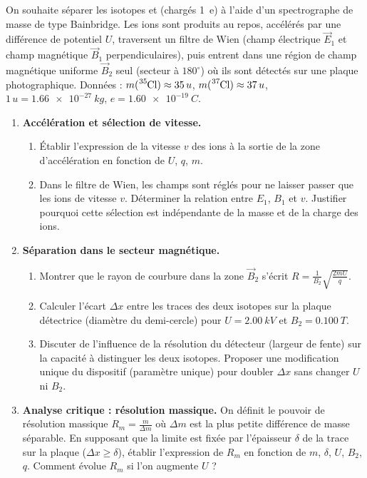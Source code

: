 \documentclass[11pt]{article}
\begin{document}
\begin{exercice}
On souhaite séparer les isotopes  et  (chargés \SI{+1}{e}) à l'aide d'un spectrographe de masse de type Bainbridge. Les ions sont produits au repos, accélérés par une différence de potentiel $U$, traversent un filtre de Wien (champ électrique $\vec{E}_1$ et champ magnétique $\vec{B}_1$ perpendiculaires), puis entrent dans une région de champ magnétique uniforme $\vec{B}_2$ seul (secteur à $180^\circ$) où ils sont détectés sur une plaque photographique.
Données : $m(\ce{^{35}Cl}) \approx 35\,u$, $m(\ce{^{37}Cl}) \approx 37\,u$, $1\,u = \SI{1.66e-27}{kg}$, $e = \SI{1.60e-19}{C}$.

\begin{enumerate}
    \item \textbf{Accélération et sélection de vitesse.} 
    \begin{enumerate}
        \item Établir l'expression de la vitesse $v$ des ions à la sortie de la zone d'accélération en fonction de $U$, $q$, $m$.
        \item Dans le filtre de Wien, les champs sont réglés pour ne laisser passer que les ions de vitesse $v$. Déterminer la relation entre $E_1$, $B_1$ et $v$. Justifier pourquoi cette sélection est indépendante de la masse et de la charge des ions.
    \end{enumerate}
    \item \textbf{Séparation dans le secteur magnétique.} 
    \begin{enumerate}
        \item Montrer que le rayon de courbure dans la zone $\vec{B}_2$ s'écrit $R = \frac{1}{B_2}\sqrt{\frac{2mU}{q}}$.
        \item Calculer l'écart $\Delta x$ entre les traces des deux isotopes sur la plaque détectrice (diamètre du demi-cercle) pour $U = \SI{2.00}{kV}$ et $B_2 = \SI{0.100}{T}$.
        \item Discuter de l'influence de la résolution du détecteur (largeur de fente) sur la capacité à distinguer les deux isotopes. Proposer une modification unique du dispositif (paramètre unique) pour doubler $\Delta x$ sans changer $U$ ni $B_2$.
    \end{enumerate}
    \item \textbf{Analyse critique : résolution massique.} 
    On définit le pouvoir de résolution massique $R_m = \frac{m}{\Delta m}$ où $\Delta m$ est la plus petite différence de masse séparable. En supposant que la limite est fixée par l'épaisseur $\delta$ de la trace sur la plaque ($\Delta x \ge \delta$), établir l'expression de $R_m$ en fonction de $m$, $\delta$, $U$, $B_2$, $q$. Comment évolue $R_m$ si l'on augmente $U$ ?
\end{enumerate}
\end{exercice}
\end{document}
